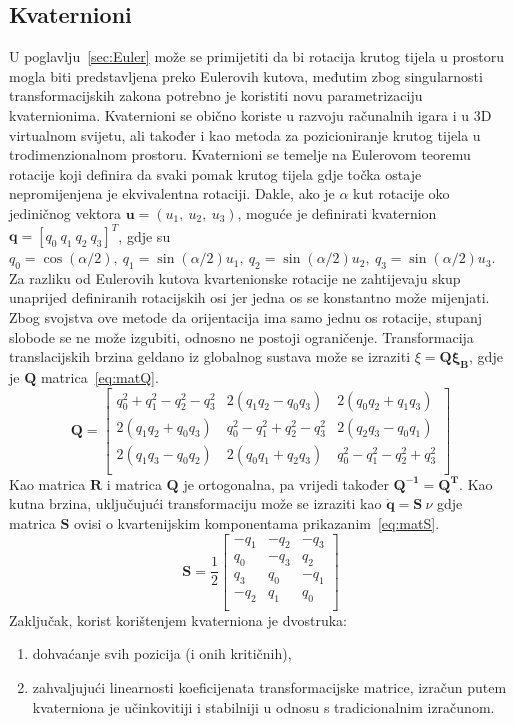 \documentclass[times, utf8, diplomski]{fer}
\begin{document}
{\subsection{Kvaternioni}\label{sec:Kvaternioni}
U poglavlju~\ref{sec:Euler} može se primijetiti da bi rotacija krutog tijela u prostoru mogla biti predstavljena preko Eulerovih kutova, međutim zbog singularnosti transformacijskih zakona potrebno je koristiti novu parametrizaciju kvaternionima. Kvaternioni se obično koriste u razvoju računalnih igara i u 3D virtualnom svijetu, ali također i kao metoda za pozicioniranje krutog tijela u trodimenzionalnom prostoru. Kvaternioni se temelje na Eulerovom teoremu rotacije koji definira da svaki pomak krutog tijela gdje točka ostaje nepromijenjena je ekvivalentna rotaciji. Dakle, ako je $\alpha$ kut rotacije oko jediničnog vektora $\mathbf{u} = (u_1, ~u_2, ~u_3)$, moguće je definirati kvaternion $\mathbf{q} = [q_0 ~q_1 ~q_2 ~q_3]^T$, gdje su $q_0 = \cos(\alpha/2), ~q_1 = \sin(\alpha/2)u_1, ~q_2 = \sin(\alpha/2)u_2, ~q_3 = \sin(\alpha/2)u_3$. Za razliku od Eulerovih kutova kvartenionske rotacije ne zahtijevaju skup unaprijed definiranih rotacijskih osi jer jedna os  se konstantno može mijenjati. Zbog svojstva ove metode da orijentacija ima samo jednu os rotacije, stupanj slobode se ne može izgubiti, odnosno ne postoji ograničenje. Transformacija translacijskih brzina geldano iz globalnog sustava može se izraziti $\xi=\mathbf{Q\xi_B}$, gdje je $\mathbf{Q}$ matrica~\ref{eq:matQ}.
\begin{equation}
	\mathbf{Q} =
	\begin{bmatrix}
	q^2_0+q^2_1-q^2_2-q^2_3 & 2(q_1q_2-q_0q_3) & 2(q_0q_2+q_1q_3) \\
	2(q_1q_2+q_0q_3) & q^2_0-q^2_1+q^2_2-q^2_3 & 2(q_2q_3-q_0q_1) \\
	2(q_1q_3-q_0q_2) & 2(q_0q_1+q_2q_3) & q^2_0-q^2_1-q^2_2+q^2_3 \\
	\end{bmatrix}
	\label{eq:matQ}
\end{equation}
Kao matrica $\mathbf{R}$ i matrica $\mathbf{Q}$ je ortogonalna, pa vrijedi također $\mathbf{Q^{-1} = Q^{T}}$. Kao kutna brzina, uključujući transformaciju može se izraziti kao $\mathbf{\dot{q}}=\mathbf{S}~\nu$ gdje matrica $\mathbf{S}$ ovisi o kvartenijskim komponentama prikazanim~\ref{eq:matS}.
\begin{equation}
	\mathbf{S} = \frac{1}{2}
	\begin{bmatrix}
	-q_1 & -q_2 & -q_3 \\
	q_0 & -q_3 & q_2 \\
	q_3 & q_0 & -q_1 \\
	-q_2 & q_1 & q_0 \\
	\end{bmatrix}
	\label{eq:matS}
\end{equation}
Zaključak, korist korištenjem kvaterniona je dvostruka: \begin{enumerate}
\item dohvaćanje svih pozicija (i onih kritičnih),
\item zahvaljujući linearnosti koeficijenata transformacijske matrice, izračun putem kvaterniona je učinkovitiji i stabilniji u odnosu s tradicionalnim izračunom.
\end{enumerate}

}
\end{document}
